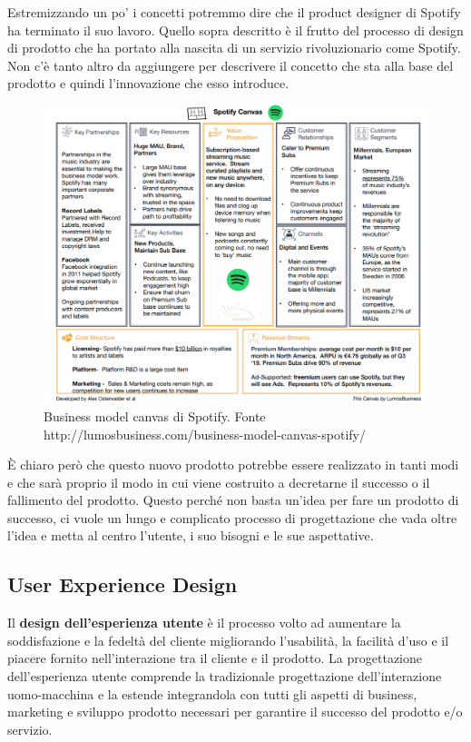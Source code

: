 Estremizzando un po' i concetti potremmo dire che il product designer di Spotify ha terminato il suo lavoro. Quello sopra descritto è il frutto del processo di design di prodotto che ha portato alla nascita di un servizio rivoluzionario come Spotify. Non c'è tanto altro da aggiungere per descrivere il concetto che sta alla base del prodotto e quindi l'innovazione che esso introduce.

\begin{figure}[!h]
	\centering
	\includegraphics[width=\textwidth]{immagini/spotifycanvas.png}
	\caption{Business model canvas di Spotify. Fonte http://lumosbusiness.com/business-model-canvas-spotify/}
\end{figure}

È chiaro però che questo nuovo prodotto potrebbe essere realizzato in tanti modi e che sarà proprio il modo in cui viene costruito a decretarne il successo o il fallimento del prodotto. Questo perché non basta un'idea per fare un prodotto di successo, ci vuole un lungo e complicato processo di progettazione che vada oltre l'idea e metta al centro l'utente, i suo bisogni e le sue aspettative.

\subsection{User Experience Design}
Il \textbf{design dell'esperienza utente} è il processo volto ad aumentare la soddisfazione e la fedeltà del cliente migliorando l'usabilità, la facilità d'uso e il piacere fornito nell'interazione tra il cliente e il prodotto. La progettazione dell'esperienza utente comprende la tradizionale progettazione dell'interazione uomo-macchina e la estende integrandola con tutti gli aspetti di business, marketing e sviluppo prodotto necessari per garantire il successo del prodotto e/o servizio.

